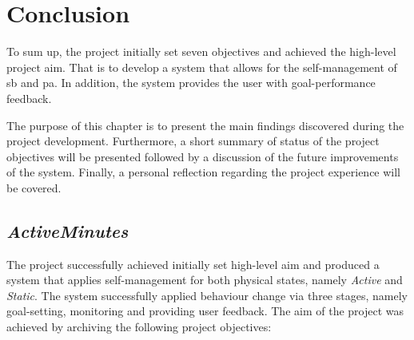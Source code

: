 \chapter{Conclusion}
To sum up, the project initially set seven objectives and achieved the high-level project aim. That is to develop a system that allows for the self-management of \gls{sb} and \gls{pa}. In addition, the system provides the user with goal-performance feedback. 

The purpose of this chapter is to present the main findings discovered during the project development. Furthermore, a short summary of status of the project objectives will be presented followed by a discussion of the future improvements of the system. Finally, a personal reflection regarding the project experience will be covered. 

\section{\textit{ActiveMinutes}}
The project successfully achieved initially set high-level aim and produced a system that applies self-management for both physical states, namely \textit{Active} and \textit{Static}. The system successfully applied behaviour change via three stages, namely goal-setting, monitoring and providing user feedback. The aim of the project was achieved by archiving the following project objectives:

